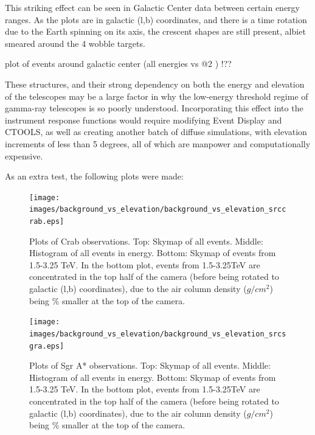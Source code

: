     This striking effect can be seen in Galactic Center data between certain energy ranges.
    As the plots are in galactic (l,b) coordinates, and there is a time rotation due to the Earth spinning on its axis, the crescent shapes are still present, albiet smeared around the 4 wobble targets.

    plot of events around galactic center (all energies vs @2 \TeV ) !??
    
    These structures, and their strong dependency on both the energy and elevation of the telescopes may be a large factor in why the low-energy threshold regime of gamma-ray telescopes is so poorly understood.
    Incorporating this effect into the instrument response functions would require modifying Event Display and CTOOLS, as well as creating another batch of diffuse simulations, with elevation increments of less than 5 degrees, all of which are manpower and computationally expensive.
    
    As an extra test, the following plots were made:
    
    
    
    
  \begin{figure}[ht]
    \centering
    \texttt{[image: images/background\_vs\_elevation/background\_vs\_elevation\_srccrab.eps]}
    \caption[Background Vs Elevation Crab]
    {\small 
      Plots of Crab observations.
      Top: Skymap of all events.  Middle: Histogram of all events in energy.  Bottom: Skymap of events from 1.5-3.25 TeV.  
      In the bottom plot, events from 1.5-3.25TeV are concentrated in the top half of the camera (before being rotated to galactic (l,b) coordinates), due to the air column density ($g/cm^2$) being \% smaller at the top of the camera.
    }
    \label{fig:bkgvsel_crab}
  \end{figure}

  \begin{figure}[ht]
    \centering
    \texttt{[image: images/background\_vs\_elevation/background\_vs\_elevation\_srcsgra.eps]}
    \caption[Background Vs Elevation Sgr A*]
    {\small 
      Plots of Sgr A* observations.
      Top: Skymap of all events.  Middle: Histogram of all events in energy.  Bottom: Skymap of events from 1.5-3.25 TeV.  
      In the bottom plot, events from 1.5-3.25TeV are concentrated in the top half of the camera (before being rotated to galactic (l,b) coordinates), due to the air column density ($g/cm^2$) being \% smaller at the top of the camera.
    }
    \label{fig:bkgvsel_sgra}
  \end{figure}
      
